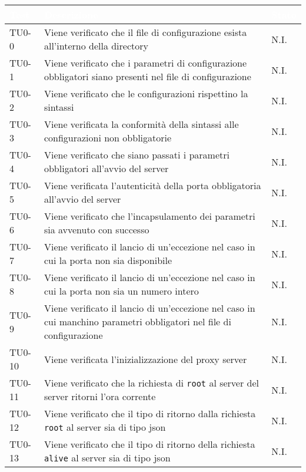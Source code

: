 \begin{longtable}{|C{.15\textwidth}|m{.65\textwidth}|C{.20\textwidth}|}
\hline
{}\textbf{\textcolor{white}{Test}}  & \textbf{\textcolor{white}{Descrizione}} & \textbf{\textcolor{white}{Stato}}\\
\hline \hline
\endhead

TU0-0 & Viene verificato che il file di configurazione esista all'interno della directory & N.I.\\
\hline 
{} TU0-1 & Viene verificato che i parametri di configurazione obbligatori siano presenti nel file di configurazione & N.I. \\ 
\hline
TU0-2 & Viene verificato che le configurazioni rispettino la sintassi & N.I. \\ 
\hline
{} TU0-3 & Viene verificata la conformità della sintassi alle configurazioni non obbligatorie & N.I. \\ 
\hline 
TU0-4 & Viene verificato che siano passati i parametri obbligatori all'avvio del server & N.I. \\ 
\hline
{} TU0-5 & Viene verificata l'autenticità della porta obbligatoria all'avvio del server & N.I. \\ 
\hline
TU0-6 & Viene verificato  che l'incapsulamento dei parametri sia avvenuto con successo & N.I. \\
\hline 
{} TU0-7 & Viene verificato il lancio di un'eccezione nel caso in cui la porta non sia disponibile & N.I. \\ 
\hline 
TU0-8 & Viene verificato il lancio di un'eccezione nel caso in cui la porta non sia un numero intero & N.I. \\
\hline
{}  TU0-9 & Viene verificato il lancio di un'eccezione nel caso in cui manchino parametri obbligatori nel file di configurazione & N.I. \\ 
\hline
TU0-10 & Viene verificata l'inizializzazione del proxy server & N.I. \\ 
\hline 
{} TU0-11 & Viene verificato che la richiesta di \texttt{root} al server del server ritorni l'ora corrente & N.I. \\ 
\hline
TU0-12 & Viene verificato che il tipo di ritorno dalla richiesta \texttt{root} al server sia di tipo json & N.I. \\ 
\hline 
{}TU0-13 & Viene verificato che il tipo di ritorno della richiesta \texttt{alive} al server sia di tipo json & N.I. \\ 

\end{longtable}
